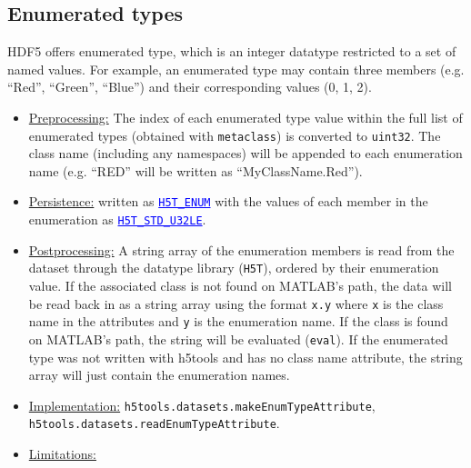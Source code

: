 \documentclass[11pt]{exam}
\newcommand\myurl[1]{\textcolor{blue}{\underline{#1}}}
\newcommand\myfcn[1]{\colorbox{codegray}{\textcolor{codeblue}{\texttt{#1}}}}
\newcommand\matfcn[1]{\textcolor{darkteal}{\texttt{#1}}}
\newcommand\hdftype[1]{\texttt{\myurl{#1}}}
\begin{document}
		\subsection{Enumerated types}
		\noindent HDF5 offers enumerated type, which is an integer datatype restricted to a set of named values. For example, an enumerated type may contain three members (e.g. ``Red'', ``Green'', ``Blue'') and their corresponding values (0, 1, 2).
		\begin{itemize}
			\item \underline{Preprocessing:} The index of each enumerated type value within the full list of enumerated types  (obtained with \matfcn{metaclass}) is converted to \texttt{uint32}. The class name (including any namespaces) will be appended to each enumeration name (e.g. ``RED'' will be written as ``MyClassName.Red'').
			\item \underline{Persistence:} written as \myurl{\texttt{H5T\_ENUM}} with the values of each member in the enumeration as \hdftype{H5T\_STD\_U32LE}. 
			\item \underline{Postprocessing:} A string array of the enumeration members is read from the dataset through the datatype library (\texttt{H5T}), ordered by their enumeration value. If the associated class is not found on MATLAB's path, the data will be read back in as a string array using the format \texttt{x.y} where \texttt{x} is the class name in the attributes and \texttt{y} is the enumeration name. If the class is found on MATLAB's path, the string will be evaluated (\texttt{eval}). If the enumerated type was not written with h5tools and has no class name attribute, the string array will just contain the enumeration names. %
			\item \underline{Implementation:} \myfcn{h5tools.datasets.makeEnumTypeAttribute},\\ \myfcn{h5tools.datasets.readEnumTypeAttribute}.
			\item \underline{Limitations:} 
		\end{itemize}
\end{document}
